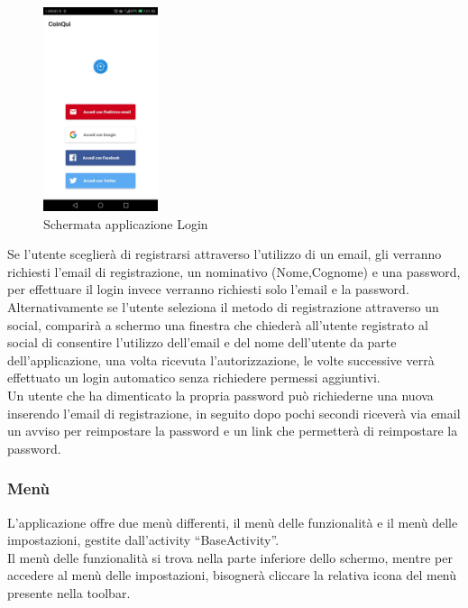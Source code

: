 \begin{figure}[!hb]
  \centering
  \includegraphics[width=0.3\textwidth]{immagini/app_login.jpg}
  \caption{Schermata applicazione Login}\label{fig:Schermata applicazione Login}
\end{figure}

Se l'utente sceglierà di registrarsi attraverso l'utilizzo di un email, gli verranno richiesti l'email di registrazione, un nominativo (Nome,Cognome) e una password, per effettuare il login invece verranno richiesti solo l'email e la password.\\
Alternativamente se l'utente seleziona il metodo di registrazione attraverso un social, comparirà a schermo una finestra che chiederà all'utente registrato al social di consentire l'utilizzo dell'email e del nome dell'utente da parte dell'applicazione, una volta ricevuta l'autorizzazione, le volte successive verrà effettuato un login automatico senza richiedere permessi aggiuntivi.\\
Un utente che ha dimenticato la propria password può richiederne una nuova inserendo l'email di registrazione, in seguito dopo pochi secondi riceverà via email un avviso per reimpostare la password e un link che permetterà di reimpostare la password.\\


\subsubsection{Menù}
L'applicazione offre due menù differenti, il menù delle funzionalità e il menù delle impostazioni, gestite dall'activity ``BaseActivity''.\\
Il menù delle funzionalità si trova nella parte inferiore dello schermo, mentre per accedere al menù delle impostazioni, bisognerà cliccare la relativa icona del menù presente nella toolbar.\\

